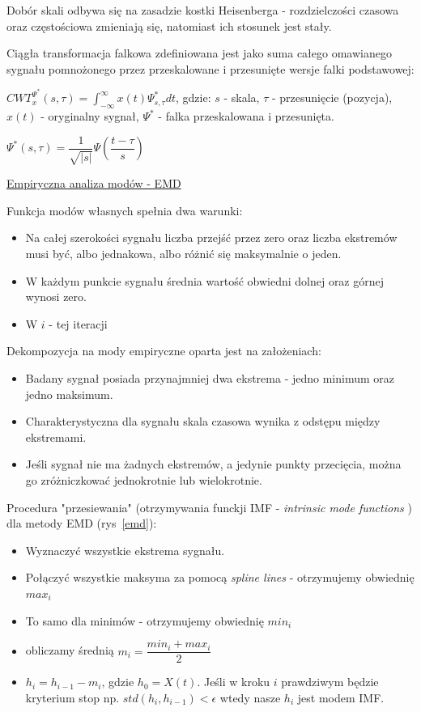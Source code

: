 Dobór skali odbywa się na zasadzie kostki Heisenberga - rozdzielczości czasowa oraz częstościowa zmieniają się, natomiast ich stosunek jest stały.

Ciągła transformacja falkowa zdefiniowana jest jako suma całego omawianego sygnału
pomnożonego przez przeskalowane i przesunięte wersje falki podstawowej:

$ CWT_x^{\Psi^*} (s, \tau) = \int_{-\infty}^{\infty} x(t) \Psi^*_{s, \tau} dt $, gdzie: \newline
$ s $ - skala, \newline
$ \tau $ - przesunięcie (pozycja), \newline
$ x(t) $ - oryginalny sygnał, \newline
$ \Psi^* $ - falka przeskalowana i przesunięta.

$ \Psi^*(s, \tau) = \dfrac{1}{\sqrt{|s|}} \Psi(\dfrac{t- \tau}{s}) $

\underline{Empiryczna analiza modów - EMD}

Funkcja modów własnych spełnia dwa warunki:
\begin{itemize}
	\item Na całej szerokości sygnału liczba przejść przez zero oraz liczba ekstremów musi być, albo jednakowa, albo różnić się maksymalnie o jeden.
	\item W każdym punkcie sygnału średnia wartość obwiedni dolnej oraz górnej wynosi zero.
	\item W $ i $ - tej iteracji 
\end{itemize}

Dekompozycja na mody empiryczne oparta jest na założeniach:\newline
\begin{itemize}
	\item Badany sygnał posiada przynajmniej dwa ekstrema - jedno minimum oraz jedno maksimum.
	\item Charakterystyczna dla sygnału skala czasowa wynika z odstępu między ekstremami.
	\item Jeśli sygnał nie ma żadnych ekstremów, a jedynie punkty przecięcia, można go zróżniczkować jednokrotnie lub wielokrotnie.
\end{itemize}

Procedura "przesiewania" (otrzymywania funckji IMF - \textit{intrinsic mode functions} ) dla metody EMD (rys~\ref{emd}):
\begin{itemize}
	\item Wyznaczyć wszystkie ekstrema sygnału.
	\item Połączyć wszystkie maksyma za pomocą \textit{spline lines} - otrzymujemy obwiednię $ max_i $
	\item To samo dla minimów - otrzymujemy obwiednię $ min_i $
	\item obliczamy średnią $ m_i = \dfrac{min_i + max_i}{2} $
	\item $ h_i = h_{i-1} - m_i $, gdzie $ h_0 = X(t) $. Jeśli w kroku $ i $ prawdziwym będzie kryterium stop np. $ std(h_i, h_{i-1}) < \epsilon $ wtedy nasze $ h_i $ jest modem IMF.
\end{itemize}

